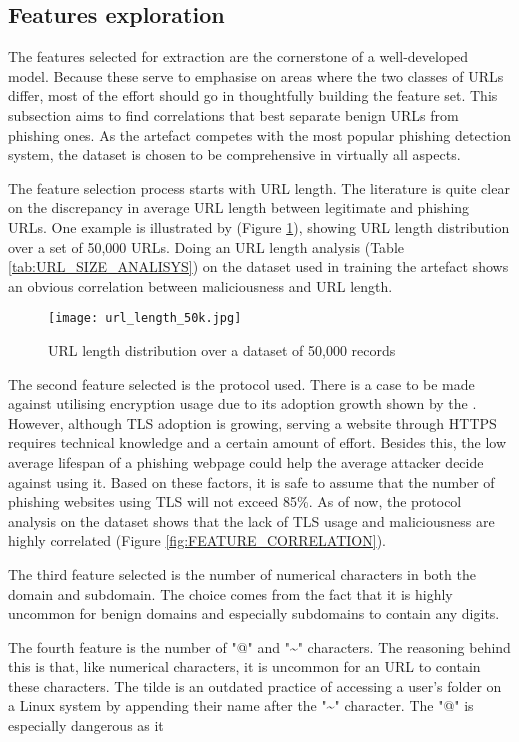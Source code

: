 \subsection{Features exploration}
The features selected for extraction are the cornerstone of a well-developed model. Because these serve to emphasise on areas where the two classes of URLs differ, most of the effort should go in thoughtfully building the feature set. This subsection aims to find correlations that best separate benign URLs from phishing ones. As the artefact competes with the most popular phishing detection system, the dataset is chosen to be comprehensive in virtually all aspects.

The feature selection process starts with URL length. The literature is quite clear on the discrepancy in average URL length between legitimate and phishing URLs. One example is illustrated by \cite{Li_Yukun} (Figure \ref{fig:URL_LENGTH_DISTRIBUTION}), showing URL length distribution over a set of 50,000 URLs. Doing an URL length analysis (Table \ref{tab:URL_SIZE_ANALISYS}) on the dataset used in training the artefact shows an obvious correlation between maliciousness and URL length.

\begin{figure}[t]
	\centering
	\texttt{[image: url\_length\_50k.jpg]}
	\caption{URL length distribution over a dataset of 50,000 records \citep{Li_Yukun}}
	\label{fig:URL_LENGTH_DISTRIBUTION}
\end{figure}

The second feature selected is the protocol used. There is a case to be made against utilising encryption usage due to its adoption growth shown by the \cite{APWG_Q42019}. However, although TLS adoption is growing, serving a website through HTTPS requires technical knowledge and a certain amount of effort. Besides this, the low average lifespan of a phishing webpage could help the average attacker decide against using it. Based on these factors, it is safe to assume that the number of phishing websites using TLS will not exceed 85\%. As of now, the protocol analysis on the dataset shows that the lack of TLS usage and maliciousness are highly correlated (Figure \ref{fig:FEATURE_CORRELATION}).

The third feature selected is the number of numerical characters in both the domain and subdomain. The choice comes from the fact that it is highly uncommon for benign domains and especially subdomains to contain any digits.

The fourth feature is the number of "@" and "\textasciitilde" characters. The reasoning behind this is that, like numerical characters, it is uncommon for an URL to contain these characters. The tilde is an outdated practice of accessing a user's folder on a Linux system by appending their name after the "\textasciitilde" character. The "@" is especially dangerous as it

